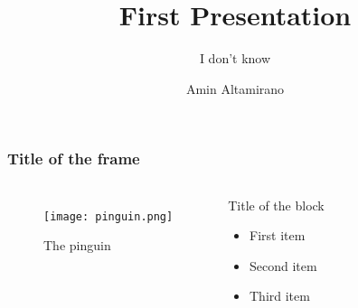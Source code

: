 \documentclass[11pt]{beamer}
\begin{document}
	\author{Amin Altamirano}
	\title{First Presentation}
	\subtitle{I don't know}
	\subject{This is the subject}
	\begin{frame}[plain]

	
	\maketitle
\end{frame}

\begin{frame}
\frametitle{Title of the frame}
\begin{columns}[c]
\begin{figure}[h!]
	\begin{center}
		\texttt{[image: pinguin.png]}
	\end{center} 
	\caption{The pinguin}
	\label{fig:nutria1}
\end{figure}
	\begin{block}{Title of the block}
	\begin{itemize}
		\item<1-3> First item
		\item<2> Second item
		\item<3> Third item
	\end{itemize}

	\end{block}
\end{columns}
\end{frame}
\end{document}
